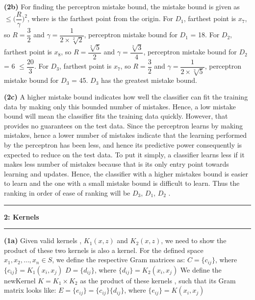 \documentclass{article}
\newcommand\question[2]{\vspace{.25in}\hrule\textbf{#1: #2}\hrule\vspace{.10in}}
\renewcommand\part[1]{\vspace{.10in}\textbf{(#1)}}
\begin{document}
    \part{2b}
    For finding the perceptron mistake bound, the mistake bound is given as $\leq \bigg ( \dfrac{R}{\gamma} \bigg )^2$, where is the farthest point from the origin. \newline
    For $D_1$, farthest point is $x_7$, so $R=\dfrac{3}{2}$ and $\gamma = \dfrac{1}{2 \times \sqrt[2]{2}}$, perceptron mistake bound for $D_1$ = 18. \newline
    For $D_2$, farthest point is $x_8$, so $R=\dfrac{\sqrt[2]{5}}{2}$ and $\gamma=\dfrac{\sqrt[2]{3}}{4}$, perceptron mistake bound for $D_2$ = 6 $\leq \dfrac{20}{3}$. \newline
    For $D_3$, farthest point is $x_7$, so $R=\dfrac{3}{2}$ and $\gamma = \dfrac{1}{2\times \sqrt[2]{5}}$, perceptron mistake bound for $D_3$ = 45. \newline
    $D_3$ has the greatest mistake bound. \newline

    \part{2c} A higher mistake bound indicates how well the classifier can fit the training data by making only this bounded number of mistakes. Hence, a low mistake bound will mean the classifier fits the training data quickly. However, that provides no guarantees on the test data. Since the perceptron learns by making mistakes, hence a lower number of mistakes indicate that the learning performed by the perceptron has been less, and hence its predictive power consequently is expected to reduce on the test data. To put it simply, a classifier learns less if it makes less number of mistakes because that is its only entry point towards learning and updates. Hence, the classifier with a higher mistakes bound is easier to learn and the one with a small mistake bound is difficult to learn. Thus the ranking in order of ease of ranking will be $D_3$, $D_1$, $D_2$ . \newline

    \question{2}{Kernels}
    \part{1a} Given valid kernels , $K_1(x,z)$ and $K_2(x,z)$, we need to show the product of these two kernels is also a kernel. For the defined space $x_1, x_2, \dots, x_n \in S$, we define the respective Gram matrices as: \newline
    $ C = \{c_{ij}\}$, where $\{c_{ij}\} = K_1(x_i, x_j) $ \newline
    $ D = \{d_{ij}\}$, where $\{d_{ij}\} = K_2(x_i, x_j) $ \newline
    We define the newKernel $K=K_1 \times K_2$ as the product of these kernels , such that its Gram matrix looks like: \newline
    $ E = \{e_{ij}\} = \{c_{ij}\}\{d_{ij}\}$, where $\{e_{ij}\}  = K(x_i, x_j) $ \newline
\end{document}
